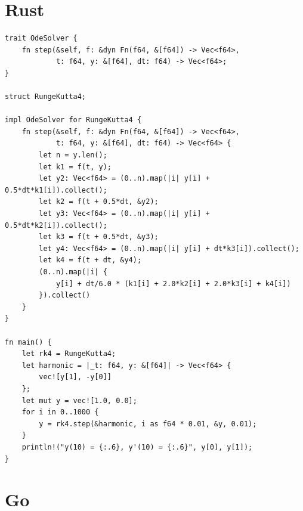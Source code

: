 \section{Rust}

\begin{lstlisting}[style=rust, caption={Solucionador RK4 con traits}]
trait OdeSolver {
    fn step(&self, f: &dyn Fn(f64, &[f64]) -> Vec<f64>,
            t: f64, y: &[f64], dt: f64) -> Vec<f64>;
}

struct RungeKutta4;

impl OdeSolver for RungeKutta4 {
    fn step(&self, f: &dyn Fn(f64, &[f64]) -> Vec<f64>,
            t: f64, y: &[f64], dt: f64) -> Vec<f64> {
        let n = y.len();
        let k1 = f(t, y);
        let y2: Vec<f64> = (0..n).map(|i| y[i] + 0.5*dt*k1[i]).collect();
        let k2 = f(t + 0.5*dt, &y2);
        let y3: Vec<f64> = (0..n).map(|i| y[i] + 0.5*dt*k2[i]).collect();
        let k3 = f(t + 0.5*dt, &y3);
        let y4: Vec<f64> = (0..n).map(|i| y[i] + dt*k3[i]).collect();
        let k4 = f(t + dt, &y4);
        (0..n).map(|i| {
            y[i] + dt/6.0 * (k1[i] + 2.0*k2[i] + 2.0*k3[i] + k4[i])
        }).collect()
    }
}

fn main() {
    let rk4 = RungeKutta4;
    let harmonic = |_t: f64, y: &[f64]| -> Vec<f64> {
        vec![y[1], -y[0]]
    };
    let mut y = vec![1.0, 0.0];
    for i in 0..1000 {
        y = rk4.step(&harmonic, i as f64 * 0.01, &y, 0.01);
    }
    println!("y(10) = {:.6}, y'(10) = {:.6}", y[0], y[1]);
}
\end{lstlisting}

\section{Go}


